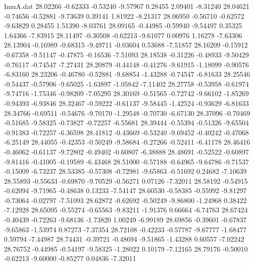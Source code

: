 \begin{filecontents}{ImuA.dat}
  28.02266   -0.62333   -0.53240   -9.57967    0.28455    2.09401   -8.31240
  28.04621   -0.74656   -0.52881   -9.73639    0.39141    1.81922   -8.21317
  28.06950   -0.56710   -0.62572   -9.63829    0.28455    1.51390   -8.03761
  28.09165   -0.44985   -0.59940   -9.54497    0.35325    1.64366   -7.83915
  28.11497   -0.30508   -0.62213   -9.61077    0.00976    1.16278   -7.63306
  28.13904   -0.16989   -0.68315   -9.49711   -0.03604    0.53688   -7.51857
  28.16209   -0.15912   -0.67358   -9.51147   -0.47875   -0.16536   -7.51093
  28.18538   -0.31226   -0.48933   -9.50429   -0.76117   -0.74547   -7.27431
  28.20879   -0.44148   -0.41276   -9.61915   -1.18099   -0.90576   -6.83160
  28.23206   -0.46780   -0.52881   -9.68854   -1.43288   -0.74547   -6.81633
  28.25546   -0.54437   -0.57906   -9.65025   -1.63897   -1.05842   -7.11402
  28.27758   -0.53958   -0.61974   -9.74716   -1.75346   -0.98209   -7.05295
  28.30169   -0.51565   -0.72742   -9.66102   -1.85269   -0.94393   -6.93846
  28.32467   -0.59222   -0.61137   -9.58445   -1.42524   -0.93629   -6.81633
  28.34766   -0.69511   -0.54676   -9.70170   -1.29548   -0.70730   -6.67130
  28.37096   -0.70469   -0.51685   -9.58325   -0.73827   -0.72257   -6.55681
  28.39444   -0.55394   -0.51326   -9.65504   -0.91383   -0.72257   -6.36598
  28.41812   -0.43669   -0.53240   -9.69452   -0.40242   -0.47068   -6.25149
  28.44055   -0.42353   -0.50249   -9.58684   -0.27266   -0.52411   -6.41178
  28.46416   -0.46062   -0.61137   -9.72802   -0.49402   -0.60807   -6.38888
  28.48691   -0.52522   -0.60897   -9.81416   -0.41005   -0.19589   -6.43468
  28.51000   -0.57188   -0.64965   -9.64786   -0.71537   -0.15009   -6.73237
  28.53385   -0.57308   -0.72981   -9.65863   -0.51692    0.24682   -7.10639
  28.55893   -0.55633   -0.69870   -9.70529   -0.56271    0.07126   -7.32011
  28.58192   -0.54915   -0.62094   -9.71965   -0.48638    0.13233   -7.54147
  28.60530   -0.58385   -0.55992   -9.81297   -0.73064   -0.02797   -7.51093
  28.62872   -0.62692   -0.50249   -9.86800   -1.24968    0.38422   -7.12928
  28.65095   -0.55274   -0.65563   -9.83211   -1.91376    0.66664   -6.74763
  28.67424   -0.40439   -0.72263   -9.68136   -1.73820    1.00249   -6.99189
  28.69856   -0.39601   -0.67837   -9.65863   -1.53974    0.87273   -7.37354
  28.72108   -0.42233   -0.57787   -9.67777   -1.68477    0.59794   -7.44987
  28.74431   -0.39721   -0.48694   -9.51865   -1.43288    0.60557   -7.02242
  28.76752   -0.44985   -0.54197   -9.58325   -1.28022    0.10179   -7.12165
  28.79176   -0.50010   -0.62213   -9.60000   -0.85277    0.04836   -7.32011

\end{filecontents}
